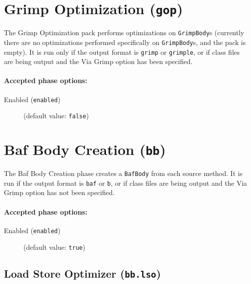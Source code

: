 \documentclass{article}
\begin{document}
\section{Grimp Optimization ({\tt gop})}

The Grimp Optimization pack performs optimizations on
{\tt GrimpBody}s (currently there are no optimizations
performed specifically on {\tt GrimpBody}s, and the pack is
empty). It is run only if the output format is {\tt grimp} or
{\tt grimple}, or if class files are being output and the Via
Grimp option has been specified.


\paragraph{Accepted phase options:} 

\begin{description}

\item[Enabled ({\tt enabled})]
(default value: {\tt false})






\end{description}

\section{Baf Body Creation ({\tt bb})}

The Baf Body Creation phase creates a
{\tt BafBody} from each source method. It is
run if the output format is {\tt baf} or {\tt b}, or
if class files are being output and the Via Grimp option
has not been specified.


\paragraph{Accepted phase options:} 

\begin{description}

\item[Enabled ({\tt enabled})]
(default value: {\tt true})






\end{description}

\subsection{Load Store Optimizer ({\tt bb.lso})}
\end{document}
